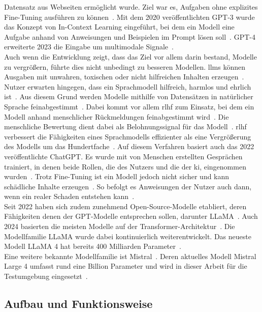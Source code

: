 Datensatz aus Webseiten ermöglicht wurde. Ziel war es, Aufgaben ohne explizites Fine-Tuning ausführen zu können~\cite[7]{llm09}. Mit dem 2020 veröffentlichten GPT-3
wurde das Konzept von In-Context Learning eingeführt, bei dem ein Modell eine Aufgabe anhand von Anweisungen und Beispielen im Prompt lösen soll~\cite[9]{llm09}. 
GPT-4 erweiterte 2023 die Eingabe um multimodale Signale~\cite[10]{llm09}. \\
Auch wenn die Entwicklung zeigt, dass das Ziel vor allem darin bestand, Modelle zu vergrößern, führte dies nicht unbedingt zu besseren Modellen. 
\acp{llm} können Ausgaben mit unwahren, toxischen oder nicht hilfreichen Inhalten erzeugen~\cite[1]{llm08}. Nutzer erwarten hingegen, dass ein Sprachmodell 
hilfreich, harmlos und ehrlich ist~\cite[2]{llm08}. Aus diesem Grund werden Modelle mithilfe von Datensätzen in natürlicher Sprache feinabgestimmt~\cite[30]{llm09}.
Dabei kommt vor allem \ac{rlhf} zum Einsatz, bei dem ein Modell anhand menschlicher Rückmeldungen feinabgestimmt wird~\cite[2]{llm08}. Die menschliche
Bewertung dient dabei als Belohnungssignal für das Modell~\cite[2]{llm08}. \ac{rlhf} verbessert die Fähigkeiten eines Sprachmodells effizienter als eine
Vergrößerung des Modells um das Hundertfache~\cite[9]{llm08}. Auf diesem Verfahren basiert auch das 2022 veröffentlichte ChatGPT. Es wurde mit von Menschen 
erstellten Gesprächen trainiert, in denen beide Rollen, die des Nutzers und die der \ac{ki}, eingenommen wurden~\cite[10]{llm09}.
Trotz Fine-Tuning ist ein Modell jedoch nicht sicher und kann schädliche Inhalte erzeugen~\cite[10]{llm08}. So befolgt es Anweisungen der Nutzer auch dann, wenn
ein realer Schaden entstehen kann~\cite[10]{llm08}. \\
Seit 2022 haben sich zudem zunehmend Open-Source-Modelle etabliert, deren Fähigkeiten denen der GPT-Modelle entsprechen sollen, darunter LLaMA~\cite[2970]{cb01}. 
Auch 2024 basierten die meisten Modelle auf der Transformer-Architektur~\cite[2970]{cb01}. Die Modellfamilie LLaMA wurde dabei kontinuierlich weiterentwickelt. 
Das neueste Modell LLaMA 4 hat bereits 400 Milliarden Parameter~\cite{llm11}. \\
Eine weitere bekannte Modellfamilie ist Mistral~\cite[11]{llm09}. Deren aktuelles Modell Mistral Large 4 umfasst rund eine Billion Parameter und wird in dieser 
Arbeit für die Testumgebung eingesetzt~\cite{llm12}.

\subsection{Aufbau und Funktionsweise}

